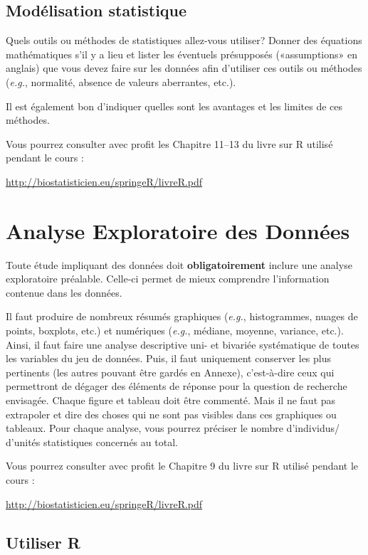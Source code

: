 \documentclass[mstat,12pt]{unswthesis}
\begin{document}
\section{Modélisation statistique}\label{moduxe9lisation-statistique}

Quels outils ou méthodes de statistiques allez-vous utiliser? Donner des
équations mathématiques s'il y a lieu et lister les éventuels
présupposés («assumptions» en anglais) que vous devez faire sur les
données afin d'utiliser ces outils ou méthodes (\emph{e.g.}, normalité,
absence de valeurs aberrantes, etc.).

Il est également bon d'indiquer quelles sont les avantages et les
limites de ces méthodes.

Vous pourrez consulter avec profit les Chapitre 11--13 du livre sur R
utilisé pendant le cours :

\url{http://biostatisticien.eu/springeR/livreR.pdf}

\chapter{Analyse Exploratoire des
Données}\label{analyse-exploratoire-des-donnuxe9es}

Toute étude impliquant des données doit \textbf{obligatoirement} inclure
une analyse exploratoire préalable. Celle-ci permet de mieux comprendre
l'information contenue dans les données.

Il faut produire de nombreux résumés graphiques (\emph{e.g.},
histogrammes, nuages de points, boxplots, etc.) et numériques
(\emph{e.g.}, médiane, moyenne, variance, etc.). Ainsi, il faut faire
une analyse descriptive uni- et bivariée systématique de toutes les
variables du jeu de données. Puis, il faut uniquement conserver les plus
pertinents (les autres pouvant être gardés en Annexe), c'est-à-dire ceux
qui permettront de dégager des éléments de réponse pour la question de
recherche envisagée. Chaque figure et tableau doit être commenté. Mais
il ne faut pas extrapoler et dire des choses qui ne sont pas visibles
dans ces graphiques ou tableaux. Pour chaque analyse, vous pourrez
préciser le nombre d'individus/ d'unités statistiques concernés au
total.

Vous pourrez consulter avec profit le Chapitre 9 du livre sur R utilisé
pendant le cours :

\url{http://biostatisticien.eu/springeR/livreR.pdf}

\section{Utiliser R}\label{utiliser-r}
\end{document}
